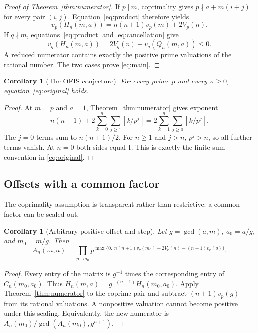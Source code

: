\documentclass[11pt,a4paper]{article}
\numberwithin{equation}{section}
\newtheorem{corollary}[theorem]{Corollary}
\theoremstyle{definition}
\theoremstyle{remark}
\newcommand{\floor}[1]{\left\lfloor#1\right\rfloor}
\begin{document}
\begin{proof}[Proof of Theorem~\ref{thm:numerator}]
If $p\mid m$, coprimality gives $p\nmid a+m(i+j)$ for every pair $(i,j)$. Equation~\eqref{eq:product} therefore yields
\[
 v_p(H_n(m,a))=n(n+1)v_p(m)+2V_p(n).
\]
If $q\nmid m$, equations~\eqref{eq:product} and \eqref{eq:cancellation} give
\[
 v_q(H_n(m,a))=2V_q(n)-v_q(Q_n(m,a))\leq0.
\]
A reduced numerator contains exactly the positive prime valuations of the rational number. The two cases prove \eqref{eq:main}.
\end{proof}

\begin{corollary}[The OEIS conjecture]\label{cor:oeis}
For every prime $p$ and every $n\geq0$, equation~\eqref{eq:original} holds.
\end{corollary}
\begin{proof}
At $m=p$ and $a=1$, Theorem~\ref{thm:numerator} gives exponent
\[
 n(n+1)+2\sum_{k=0}^n\sum_{j\geq1}\floor{k/p^j}
 =2\sum_{k=1}^n\sum_{j\geq0}\floor{k/p^j}.
\]
The $j=0$ terms sum to $n(n+1)/2$. For $n\geq1$ and $j>n$, $p^j>n$, so all further terms vanish. At $n=0$ both sides equal $1$. This is exactly the finite-sum convention in \eqref{eq:original}.
\end{proof}

\subsection{Offsets with a common factor}
The coprimality assumption is transparent rather than restrictive: a common factor can be scaled out.

\begin{corollary}[Arbitrary positive offset and step]\label{cor:noncoprime}
Let $g=\gcd(a,m)$, $a_0=a/g$, and $m_0=m/g$. Then
\begin{equation}\label{eq:noncoprime}
 A_n(m,a)=\prod_{p\mid m_0}
 p^{\max\{0,\ n(n+1)v_p(m_0)+2V_p(n)-(n+1)v_p(g)\}}.
\end{equation}
\end{corollary}
\begin{proof}
Every entry of the matrix is $g^{-1}$ times the corresponding entry of $C_n(m_0,a_0)$. Thus
$H_n(m,a)=g^{-(n+1)}H_n(m_0,a_0)$. Apply Theorem~\ref{thm:numerator} to the coprime pair and subtract $(n+1)v_p(g)$ from its rational valuations. A nonpositive valuation cannot become positive under this scaling. Equivalently, the new numerator is
$A_n(m_0)/\gcd(A_n(m_0),g^{n+1})$.
\end{proof}
\end{document}
